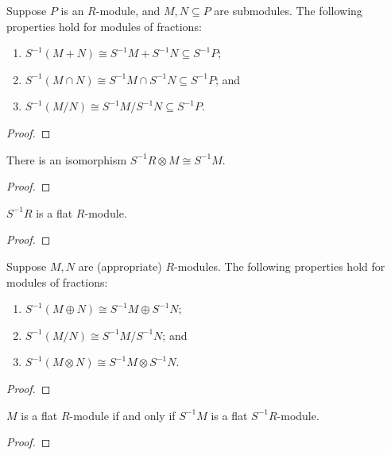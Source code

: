 \begin{proposition}
    Suppose \(P\) is an \(R\)-module,
    and \(M,N \subseteq P\) are submodules.
    The following properties hold for modules of fractions:
    \begin{enumerate}[label={(\alph*)}, itemsep=0mm]
        \item \(S^{-1}(M+N) \cong S^{-1}M + S^{-1}N \subseteq S^{-1}P\);
        \item \(S^{-1}(M \cap N) \cong S^{-1}M \cap S^{-1}N \subseteq S^{-1}P\); and
        \item \(S^{-1}(M/N) \cong S^{-1}M/S^{-1}N \subseteq S^{-1}P\).
    \end{enumerate}
\end{proposition}
\begin{proof}
    
\end{proof}

\begin{theorem}
    There is an isomorphism \(S^{-1}R \otimes M \cong S^{-1}M\).
\end{theorem}
\begin{proof}
    
\end{proof}
\begin{corollary}
    \(S^{-1}R\) is a flat \(R\)-module.
\end{corollary}
\begin{proof}
    
\end{proof}

\begin{proposition}
    Suppose \(M,N\) are (appropriate) \(R\)-modules.
    The following properties hold for modules of fractions:
    \begin{enumerate}[label={(\alph*)}, itemsep=0mm]
        \item \(S^{-1}(M \oplus N) \cong S^{-1}M \oplus S^{-1}N\);
        \item \(S^{-1}(M/N) \cong S^{-1}M/S^{-1}N\); and
        \item \(S^{-1}(M \otimes N) \cong S^{-1}M \otimes S^{-1}N\).
    \end{enumerate}
\end{proposition}
\begin{proof}
    
\end{proof}
\begin{proposition}
    \(M\) is a flat \(R\)-module if and only if \(S^{-1}M\) is a flat \(S^{-1}R\)-module.
\end{proposition}
\begin{proof}
    
\end{proof}

